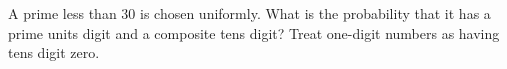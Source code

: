 A prime less than $30$ is chosen uniformly. What is the probability that it has a prime units digit and a composite tens digit? Treat one-digit numbers as having tens digit zero.
